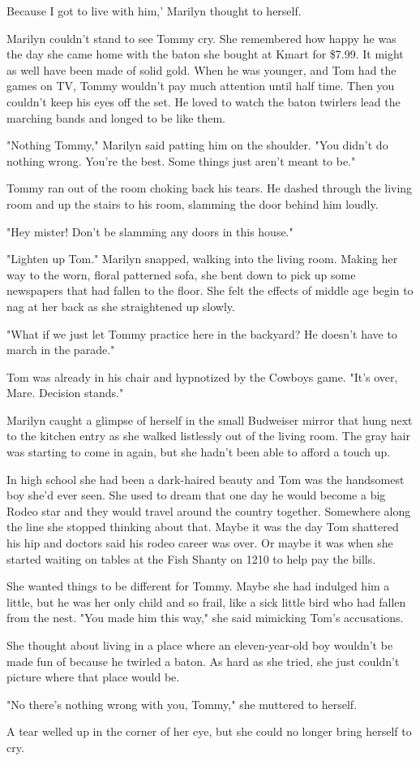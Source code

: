 \documentclass[10pt,a4paper]{article}
\begin{document}
Because I got to live with him,' Marilyn thought to herself.

Marilyn couldn't stand to see Tommy cry. She remembered how happy he was the day she came home with the baton she bought at Kmart for \$7.99. It might as well have been made of solid gold. When he was younger, and Tom had the games on TV, Tommy wouldn't pay much attention until half time. Then you couldn't keep his eyes off the set. He loved to watch the baton twirlers lead the marching bands and longed to be like them.

"Nothing Tommy," Marilyn said patting him on the shoulder. "You didn't do nothing wrong. You're the best. Some things just aren't meant to be."

Tommy ran out of the room choking back his tears. He dashed through the living room and up the stairs to his room, slamming the door behind him loudly.

"Hey mister! Don't be slamming any doors in this house."

"Lighten up Tom." Marilyn snapped, walking into the living room. Making her way to the worn, floral patterned sofa, she bent down to pick up some newspapers that had fallen to the floor. She felt the effects of middle age begin to nag at her back as she straightened up slowly.

"What if we just let Tommy practice here in the backyard? He doesn't have to march in the parade."

Tom was already in his chair and hypnotized by the Cowboys game. "It's over, Mare. Decision stands."

Marilyn caught a glimpse of herself in the small Budweiser mirror that hung next to the kitchen entry as she walked listlessly out of the living room. The gray hair was starting to come in again, but she hadn't been able to afford a touch up.

In high school she had been a dark-haired beauty and Tom was the handsomest boy she'd ever seen. She used to dream that one day he would become a big Rodeo star and they would travel around the country together. Somewhere along the line she stopped thinking about that. Maybe it was the day Tom shattered his hip and doctors said his rodeo career was over. Or maybe it was when she started waiting on tables at the Fish Shanty on 1210 to help pay the bills.

She wanted things to be different for Tommy. Maybe she had indulged him a little, but he was her only child and so frail, like a sick little bird who had fallen from the nest. "You made him this way," she said mimicking Tom's accusations.

She thought about living in a place where an eleven-year-old boy wouldn't be made fun of because he twirled a baton. As hard as she tried, she just couldn't picture where that place would be.

"No there's nothing wrong with you, Tommy," she muttered to herself.

A tear welled up in the corner of her eye, but she could no longer bring herself to cry.
\end{document}

